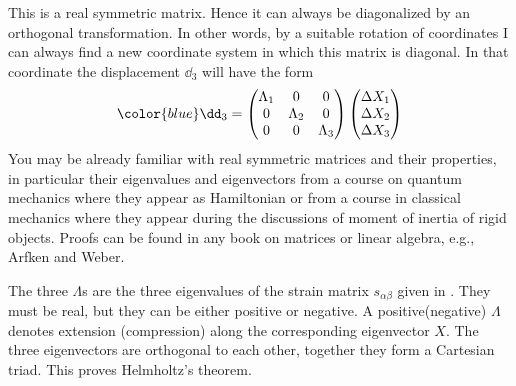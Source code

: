 This is a real symmetric matrix. Hence it can always be diagonalized
by an orthogonal transformation. In other words, by a suitable
rotation of coordinates I can always find a new coordinate system in
which this matrix is diagonal. In that coordinate the displacement $\dd_3$
will have the form
\begin{equation}
{\color{blue}\dd_3 = 
\begin{pmatrix}
\Lambda_{1} & 0 & 0  \\
0 &  \Lambda_{2} & 0  \\
0 & 0 & \Lambda_{3} 
\end{pmatrix}
\begin{pmatrix}
\Delta X_1 \\ \Delta X_2  \\ \Delta X_3
\end{pmatrix}
}
\label{eq:diag}
\end{equation}
You may be already familiar with real symmetric matrices and their properties,
in particular their eigenvalues and eigenvectors from a course on
quantum mechanics where they appear as Hamiltonian or 
from a course in classical mechanics where they appear during the
discussions of moment of inertia of rigid objects. Proofs can be found
in any book on matrices or linear algebra, e.g., Arfken and Weber\cite{Arfken}.

The three $\Lambda$s are the three eigenvalues of the strain matrix
$s_{\alpha\beta}$ given in . They must be real, but
they can be either positive or negative. A positive(negative)
$\Lambda$ denotes extension (compression) along the corresponding 
eigenvector $X$. The three eigenvectors are orthogonal to each other,
together they form a Cartesian triad. 
This proves Helmholtz's theorem. 

